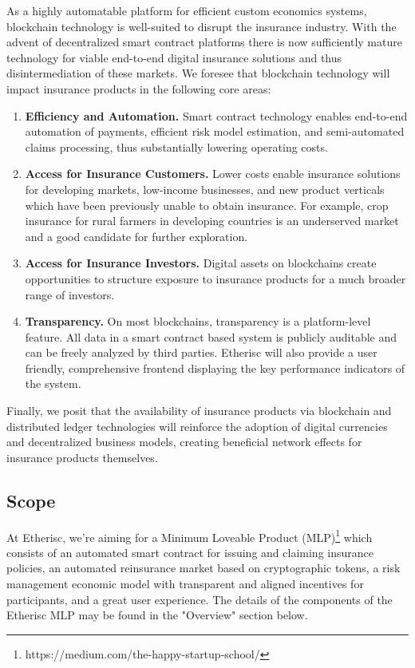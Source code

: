 \documentclass[12pt]{article}
\begin{document}
As a highly automatable platform for efficient custom economics systems, blockchain technology is well-suited to disrupt the insurance industry. With the advent of decentralized smart contract platforms there is now sufficiently mature technology for viable end-to-end digital insurance solutions and thus disintermediation of these markets. We foresee that blockchain technology will impact insurance products in the following core areas:

\begin{enumerate}
    \item \textbf{Efficiency and Automation.} Smart contract technology enables end-to-end automation of payments, efficient risk model estimation, and semi-automated claims processing, thus substantially lowering operating costs.

    \item \textbf{Access for Insurance Customers.} Lower costs enable insurance solutions for developing markets, low-income businesses, and new product verticals which have been previously unable to obtain insurance. For example, crop insurance for rural farmers in developing countries is an underserved market and a good candidate for further exploration.

    \item \textbf{Access for Insurance Investors.} Digital assets on blockchains create opportunities to structure exposure to insurance products for a much broader range of investors. 

    \item \textbf{Transparency.} On most blockchains, transparency is a platform-level feature. All data in a smart contract based system is publicly auditable and can be freely analyzed by third parties. Etherisc will also provide a user friendly, comprehensive frontend displaying the key performance indicators of the system. 
\end{enumerate}

Finally, we posit that the availability of insurance products via blockchain and distributed ledger technologies will reinforce the adoption of digital currencies and decentralized business models, creating beneficial network effects for insurance products themselves.

\subsection{Scope}

At Etherisc, we're aiming for a Minimum Loveable Product (MLP)\footnote{https://medium.com/the-happy-startup-school/} which consists of an automated smart contract for issuing and claiming insurance policies, an automated reinsurance market based on cryptographic tokens, a risk management economic model with transparent and aligned incentives for participants, and a great user experience. The details of the components of the Etherisc MLP may be found in the "Overview" section below.
\end{document}
